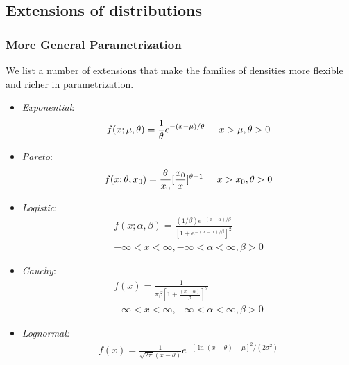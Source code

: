 \documentclass{article}
\begin{document}
\subsection{Extensions of distributions}

\subsubsection{More General Parametrization}

We list a number of extensions that make the families of densities more flexible and richer in parametrization.

\begin{itemize}
    \item \textit{Exponential}:
    \begin{equation*}
        f(x;\mu, \theta)=\frac{1}{\theta} e^{-(x-\mu)/\theta} \hspace{0.5cm} x>\mu,\theta>0
    \end{equation*}
    \item \textit{Pareto}:
    \begin{equation*}
        f(x;\theta, x_0)=\frac{\theta}{x_0}[\frac{x_0}{x}]^{\theta+1} \hspace{0.5cm} x>x_0,\theta>0
    \end{equation*}
    \item \textit{Logistic}:
    \begin{equation*}
    \begin{split}
        f(x; \alpha,\beta)=\frac{(1/\beta)e^{-(x-\alpha)/\beta}}{[1+e^{-(x-\alpha)/\beta}]^2} \\
        -\infty<x<\infty, -\infty<\alpha<\infty, \beta>0
    \end{split}
    \end{equation*}
    \item \textit{Cauchy}:
    \begin{equation*}
    \begin{split}
        f(x)=\frac{1}{\pi\beta[1+\frac{(x-\alpha)}{\beta}]^2} \\
        -\infty<x<\infty, -\infty<\alpha<\infty, \beta>0
    \end{split}
    \end{equation*}
    \item \textit{Lognormal:}
    \begin{equation*}
    \begin{split}
       f(x)=\frac{1}{\sqrt{2\pi}(x-\theta)} e^{-[\ln(x-\theta)-\mu]^2/(2\sigma^2)} \\

\end{split}
\end{equation*}
\end{itemize}
\end{document}
